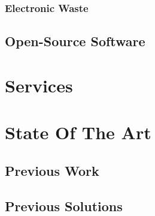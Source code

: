 \subsubsection{Electronic Waste}
\label{subsubsec:introduction_philosophy_reusability_electronic_waste}

\subsection{Open-Source Software}
\label{subsubsec:introduction_philosophy_reusability_open_source_software}

\section{Services}
\label{sec:introduction_services}

\section{State Of The Art}
\label{sec:introduction_state_of_art}

\subsection{Previous Work}
\label{subsec:introduction_state_of_art_previous_work}

\subsection{Previous Solutions}
\label{subsec:introduction_state_of_art_previous_solutions}